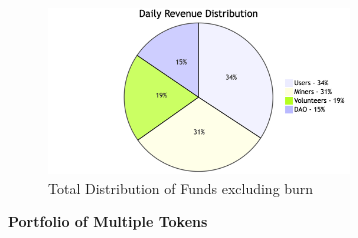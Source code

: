 \documentclass[conference]{IEEEtran}
\begin{document}
\begin{figure}[H]
\begin{center}
\includegraphics[width=8cm]{revenue-distribution}
\caption{Total Distribution of Funds excluding burn}
\end{center}
\end{figure}

\textbf{Portfolio of Multiple Tokens}\\
\end{document}
